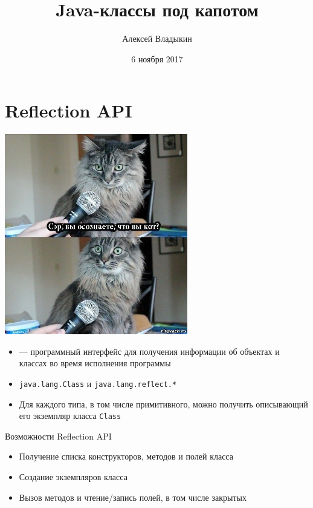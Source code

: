 \documentclass[unicode]{beamer}
\title{Java-классы под капотом}
\author{Алексей Владыкин}
\date{6 ноября 2017}
\begin{document}
\begin{frame}
\titlepage
\end{frame}

\begin{frame}
\tableofcontents
\end{frame}



\section{Reflection API}

\begin{frame}
\centering
\includegraphics[width=0.6\textwidth]{pics/reflection.jpg}
\end{frame}


\begin{frame}
\begin{itemize}
\item {} --- программный интерфейс
    для получения информации об объектах и классах во время
    исполнения программы
    \bigskip

\item \texttt{java.lang.Class} и \texttt{java.lang.reflect.*}
    \bigskip

\item Для каждого типа, в том числе примитивного, можно
    получить описывающий его экземпляр класса \texttt{Class}
\end{itemize}
\end{frame}


\begin{frame}{Возможности Reflection API}
\begin{itemize}
\item Получение списка конструкторов, методов и полей класса
    \bigskip

\item Создание экземпляров класса
    \bigskip

\item Вызов методов и чтение/запись полей, в том числе закрытых
\end{itemize}
\end{frame}
\end{document}
